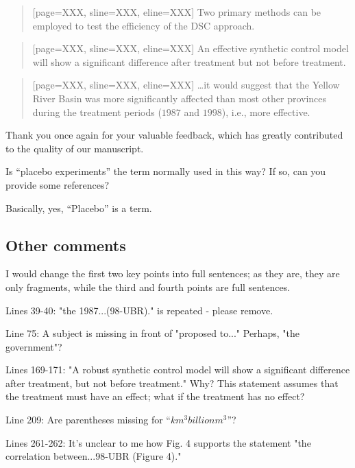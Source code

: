 \begin{quote}[page=XXX, sline=XXX, eline=XXX]
    Two primary methods can be employed to test the efficiency of the DSC approach.
\end{quote}

\begin{quote}[page=XXX, sline=XXX, eline=XXX]
    An effective synthetic control model will show a significant difference after treatment but not before treatment.
\end{quote}

\begin{quote}[page=XXX, sline=XXX, eline=XXX]
    \dots it would suggest that the Yellow River Basin was more significantly affected than most other provinces during the treatment periods ($1987$ and $1998$), i.e., more effective.
\end{quote}

\AR*{} Thank you once again for your valuable feedback, which has greatly contributed to the quality of our manuscript.

\RC{} Is ``placebo experiments'' the term normally used in this way? If so, can you provide some references?

\AR{} Basically, yes, ``Placebo'' is a term.

\subsection{Other comments}\label{sec:1-3}
\RC{} I would change the first two key points into full sentences; as they are, they are only fragments, while the third and fourth points are full sentences.

\RC{} Lines 39-40: "the 1987...(98-UBR)." is repeated - please remove.

\RC{} Line 75: A subject is missing in front of "proposed to..." Perhaps, "the government"?

\RC{} Lines 169-171: "A robust synthetic control model will show a significant difference after treatment, but not before treatment." Why? This statement assumes that the treatment must have an effect; what if the treatment has no effect?

\RC{} Line 209: Are parentheses missing for ``$km^3 billion m^3$''?

\RC{} Lines 261-262: It's unclear to me how Fig. 4 supports the statement "the correlation between...98-UBR (Figure 4)."

